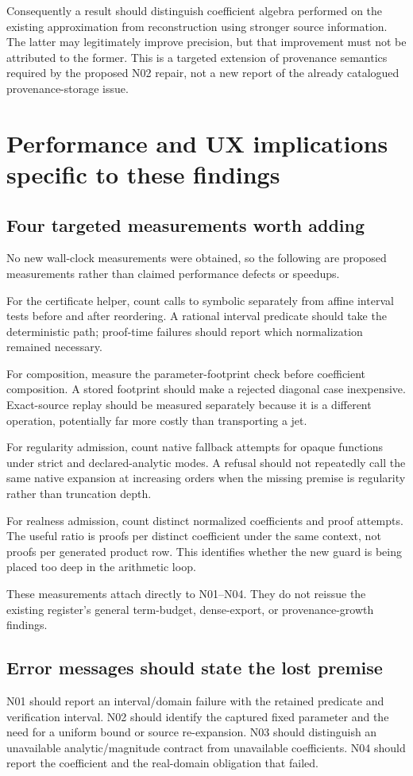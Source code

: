 \documentclass[11pt,letterpaper]{article}
\newcommand{\code}[1]{\texttt{\detokenize{#1}}}
\begin{document}
Consequently a result should distinguish coefficient algebra performed on the existing approximation from reconstruction using stronger source information. The latter may legitimately improve precision, but that improvement must not be attributed to the former. This is a targeted extension of provenance semantics required by the proposed N02 repair, not a new report of the already catalogued provenance-storage issue.

\section{Performance and UX implications specific to these findings}
\subsection{Four targeted measurements worth adding}
No new wall-clock measurements were obtained, so the following are proposed measurements rather than claimed performance defects or speedups.

For the certificate helper, count calls to symbolic \code{Refine} separately from affine interval tests before and after reordering. A rational interval predicate should take the deterministic path; proof-time failures should report which normalization remained necessary.

For composition, measure the parameter-footprint check before coefficient composition. A stored footprint should make a rejected diagonal case inexpensive. Exact-source replay should be measured separately because it is a different operation, potentially far more costly than transporting a jet.

For regularity admission, count native fallback attempts for opaque functions under strict and declared-analytic modes. A refusal should not repeatedly call the same native expansion at increasing orders when the missing premise is regularity rather than truncation depth.

For realness admission, count distinct normalized coefficients and proof attempts. The useful ratio is proofs per distinct coefficient under the same context, not proofs per generated product row. This identifies whether the new guard is being placed too deep in the arithmetic loop.

These measurements attach directly to N01--N04. They do not reissue the existing register's general term-budget, dense-export, or provenance-growth findings.\cite{status}

\subsection{Error messages should state the lost premise}
N01 should report an interval/domain failure with the retained predicate and verification interval. N02 should identify the captured fixed parameter and the need for a uniform bound or source re-expansion. N03 should distinguish an unavailable analytic/magnitude contract from unavailable coefficients. N04 should report the coefficient and the real-domain obligation that failed.
\end{document}
